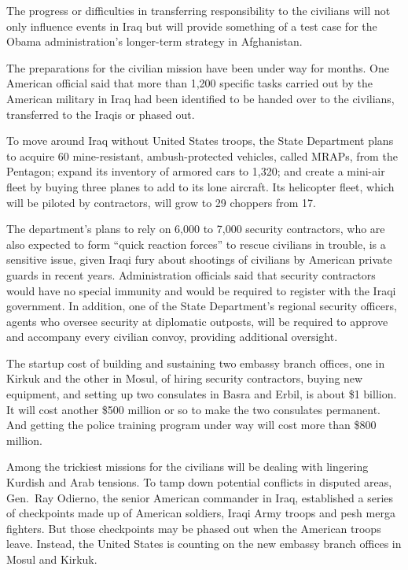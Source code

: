 ﻿\documentclass[12pt]{article}
\begin{document}
The progress or difficulties in transferring responsibility to the civilians will not only influence
events in Iraq but will provide something of a test case for the Obama administration's longer-term
strategy in Afghanistan.

The preparations for the civilian mission have been under way for months. One American official said
that more than 1,200 specific tasks carried out by the American military in Iraq had been identified
to be handed over to the civilians, transferred to the Iraqis or phased out.

To move around Iraq without United States troops, the State Department plans to acquire 60
mine-resistant, ambush-protected vehicles, called MRAPs, from the Pentagon; expand its inventory of
armored cars to 1,320; and create a mini-air fleet by buying three planes to add to its lone
aircraft. Its helicopter fleet, which will be piloted by contractors, will grow to 29 choppers from
17.

The department's plans to rely on 6,000 to 7,000 security contractors, who are also expected to form
``quick reaction forces'' to rescue civilians in trouble, is a sensitive issue, given Iraqi fury
about shootings of civilians by American private guards in recent years. Administration officials
said that security contractors would have no special immunity and would be required to register with
the Iraqi government. In addition, one of the State Department's regional security officers, agents
who oversee security at diplomatic outposts, will be required to approve and accompany every
civilian convoy, providing additional oversight.

The startup cost of building and sustaining two embassy branch offices, one in Kirkuk and the other
in Mosul, of hiring security contractors, buying new equipment, and setting up two consulates in
Basra and Erbil, is about \$1 billion. It will cost another \$500 million or so to make the two
consulates permanent. And getting the police training program under way will cost more than \$800
million.

Among the trickiest missions for the civilians will be dealing with lingering Kurdish and Arab
tensions. To tamp down potential conflicts in disputed areas, Gen.~Ray Odierno, the senior American
commander in Iraq, established a series of checkpoints made up of American soldiers, Iraqi Army
troops and pesh merga fighters. But those checkpoints may be phased out when the American troops
leave. Instead, the United States is counting on the new embassy branch offices in Mosul and Kirkuk.
\end{document}
